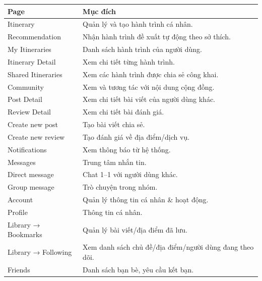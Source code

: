 \begin{table}[H]
\centering
\begin{tabular}{|p{5cm}|p{10cm}|}
\hline
Page                & Mục đích                                                \\ \hline
Itinerary           & Quản lý và tạo hành trình cá nhân.                      \\ \hline
Recommendation      & Nhận hành trình đề xuất tự động theo sở thích.          \\ \hline
My Itineraries      & Danh sách hành trình của người dùng.                    \\ \hline
Itinerary Detail    & Xem chi tiết từng hành trình.                           \\ \hline
Shared Itineraries  & Xem các hành trình được chia sẻ công khai.              \\ \hline
Community           & Xem và tương tác với nội dung cộng đồng.                \\ \hline
Post Detail         & Xem chi tiết bài viết của người dùng khác.              \\ \hline
Review Detail       & Xem chi tiết bài đánh giá.                              \\ \hline
Create new post     & Tạo bài viết chia sẻ.                                   \\ \hline
Create new review   & Tạo đánh giá về địa điểm/dịch vụ.                       \\ \hline
Notifications       & Xem thông báo từ hệ thống.                              \\ \hline
Messages            & Trung tâm nhắn tin.                                     \\ \hline
Direct message      & Chat 1–1 với người dùng khác.                           \\ \hline
Group message       & Trò chuyện trong nhóm.                                  \\ \hline
Account             & Quản lý thông tin cá nhân \& hoạt động.                 \\ \hline
Profile             & Thông tin cá nhân.                                      \\ \hline
Library → Bookmarks & Quản lý bài viết/địa điểm đã lưu.                       \\ \hline
Library → Following & Xem danh sách chủ đề/địa điểm/người dùng đang theo dõi. \\ \hline
Friends             & Danh sách bạn bè, yêu cầu kết bạn.                      \\ \hline

\end{tabular}
\end{table}
